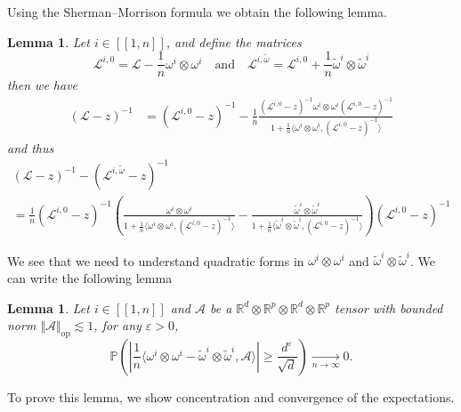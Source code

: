 \documentclass[letterpaper, 10pt, dvipsnames]{article}
\numberwithin{equation}{section}
\newcommand{\Rbb}{\mathbb{R}}
\renewcommand{\tilde}{\widetilde}
\newcommand{\wt}{\widetilde}
\renewcommand{\P}{\mathds{P}}
\newcommand{\unn}[2]{[\![#1,#2]\!]}
\newtheorem{lem}[ccounter]{Lemma}
\theoremstyle{definition}
\begin{document}
Using the Sherman--Morrison formula we obtain the following lemma.
\begin{lem}\label{lem:sherman}
  Let $i\in\unn{1}{n}$, and define the matrices
  \[
  \mathcal{L}^{i,0} = \mathcal{L} - \frac{1}{n}\omega^i\otimes\omega^i 
  \quad\text{and}\quad 
  \mathcal{L}^{i,\wt{\omega}} = \mathcal{L}^{i,0}+\frac{1}{n}\wt{\omega}^i\otimes\wt{\omega}^i
  \]
  then we have 
  \begin{align*}
  (\mathcal{L}-z)^{-1}& = (\mathcal{L}^{i,0}-z)^{-1} - \frac{1}{n} \frac{(\mathcal{L}^{i,0}-z)^{-1}\omega^i\otimes \omega^i (\mathcal{L}^{i,0}-z)^{-1}}{1+\frac{1}{n}\langle \omega^i\otimes \omega^i,(\mathcal{L}^{i,0}-z)^{-1}\rangle}  
  \end{align*}
  and thus 
  \begin{multline*}
    (\mathcal{L}-z)^{-1}-(\mathcal{L}^{i,\tilde{\omega}}-z)^{-1} \\
    =  \frac{1}{n}(\mathcal{L}^{i,0}-z)^{-1}
    \left( 
      \frac{\omega^i\otimes\omega^i}{1+\frac{1}{n}\langle \omega^i\otimes \omega^i,(\mathcal{L}^{i,0}-z)^{-1}\rangle}- \frac{\wt{\omega}^i\otimes \wt{\omega}^i}{1+\frac{1}{n}\langle \wt{\omega}^i\otimes \wt{\omega}^i,(\mathcal{L}^{i,0}-z)^{-1}\rangle} 
    \right)
    (\mathcal{L}^{i,0}-z)^{-1} 
  \end{multline*}
\end{lem}
  We see that we need to understand quadratic forms in $\omega^i \otimes \omega^i$ and $\wt{\omega}^i\otimes \wt{\omega}^i$. We can write the following lemma 
  \begin{lem}\label{lem:comparewwtilde}
    Let $i\in\unn{1}{n}$ and $\mathcal{A}$ be a $\Rbb^{d}\otimes \Rbb^p\otimes \Rbb^d\otimes  \Rbb^{p}$ tensor with bounded norm $\Vert \mathcal{A}\Vert_{\mathrm{op}}\lesssim 1$, for any $\varepsilon>0$,
    \[
    \P\left(
      \left\vert
        \frac{1}{n}\langle \omega^i\otimes \omega^i-\wt{\omega}^i\otimes \wt{\omega}^i,\mathcal{A}\rangle 
      \right\vert
      \geqslant \frac{d^\varepsilon}{\sqrt{d}}
    \right)  \xrightarrow[n\to\infty]{}0.
    \]
  \end{lem}
  To prove this lemma, we show concentration and convergence of the expectations. 
\end{document}
